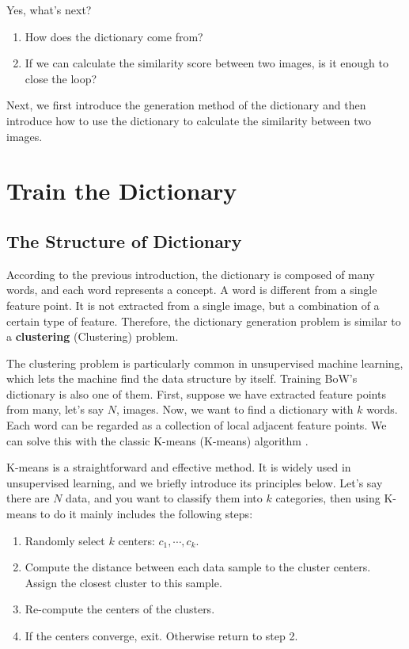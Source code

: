 Yes, what's next?
\begin{enumerate}
	\item How does the dictionary come from?
	\item If we can calculate the similarity score between two images, is it enough to close the loop?
\end{enumerate}

Next, we first introduce the generation method of the dictionary and then introduce how to use the dictionary to calculate the similarity between two images.

\section{Train the Dictionary}
\subsection{The Structure of Dictionary}
According to the previous introduction, the dictionary is composed of many words, and each word represents a concept. A word is different from a single feature point. It is not extracted from a single image, but a combination of a certain type of feature. Therefore, the dictionary generation problem is similar to a \textbf{clustering} (Clustering) problem.

The clustering problem is particularly common in unsupervised machine learning, which lets the machine find the data structure by itself. Training BoW's dictionary is also one of them. First, suppose we have extracted feature points from many, let's say $N$, images. Now, we want to find a dictionary with $k$ words. Each word can be regarded as a collection of local adjacent feature points. We can solve this with the classic K-means (K-means) algorithm {\cite{Lloyd1982}}.

K-means is a straightforward and effective method. It is widely used in unsupervised learning, and we briefly introduce its principles below. Let's say there are $N$ data, and you want to classify them into $k$ categories, then using K-means to do it mainly includes the following steps:

\begin{mdframed}
	\begin{enumerate}
		\item Randomly select $k$ centers: $c_1, \cdots, c_k$.
		\item Compute the distance between each data sample to the cluster centers. Assign the closest cluster to this sample. 
		\item Re-compute the centers of the clusters. 
		\item If the centers converge, exit. Otherwise return to step 2. 
	\end{enumerate}
\end{mdframed}







